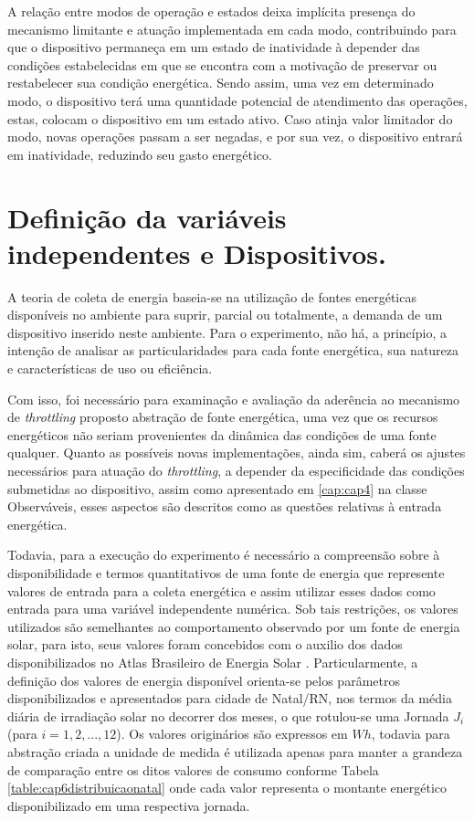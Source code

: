 A relação entre modos de operação e estados deixa implícita presença do mecanismo limitante e atuação implementada em cada modo, contribuindo para que o dispositivo permaneça em um estado de inatividade à depender das condições estabelecidas em que se encontra com a motivação de preservar ou restabelecer sua condição energética. Sendo assim, uma vez em determinado modo, o dispositivo terá uma quantidade potencial de atendimento das operações, estas, colocam o dispositivo em um estado ativo. Caso atinja valor limitador do modo, novas operações passam a ser negadas, e por sua vez, o dispositivo entrará em inatividade, reduzindo seu gasto energético.


\section{Definição da variáveis independentes e Dispositivos.}

A teoria de coleta de energia baseia-se na utilização de fontes energéticas disponíveis no ambiente para suprir, parcial ou totalmente, a demanda de um dispositivo inserido neste ambiente. Para o experimento, não há, a princípio, a intenção de analisar as particularidades para cada fonte energética, sua natureza e características de uso ou eficiência. 

Com isso, foi necessário para examinação e avaliação da aderência ao mecanismo de \textit{throttling} proposto abstração de fonte energética, uma vez que os recursos energéticos não seriam provenientes da dinâmica das condições de uma fonte qualquer. Quanto as possíveis novas implementações, ainda sim, caberá os ajustes necessários para atuação do \textit{throttling},  a depender da especificidade das condições submetidas ao dispositivo, assim como apresentado em \ref{cap:cap4} na classe Observáveis, esses aspectos são descritos como as questões relativas à entrada energética. 

Todavia, para a execução do experimento é necessário a compreensão sobre à disponibilidade e termos quantitativos de uma fonte de energia que represente valores de entrada para a coleta energética e assim utilizar esses dados como entrada para uma variável independente numérica. Sob tais restrições, os valores utilizados são semelhantes ao comportamento observado por um fonte de energia solar, para isto, seus valores foram concebidos com o auxilio dos dados disponibilizados no Atlas Brasileiro de Energia Solar \cite{martins2017atlas}. Particularmente, a definição dos valores de energia disponível orienta-se pelos parâmetros disponibilizados e apresentados para cidade de Natal/RN, nos termos da média diária de irradiação solar no decorrer  dos meses, o que rotulou-se uma Jornada $J_i$ (para $i = 1,2,...,12$). Os valores originários são expressos em  $Wh$, todavia para abstração criada a unidade de medida é utilizada apenas para manter a grandeza de comparação entre os ditos valores de consumo conforme Tabela \ref{table:cap6distribuicaonatal} onde cada valor representa o montante energético disponibilizado em uma respectiva jornada.

